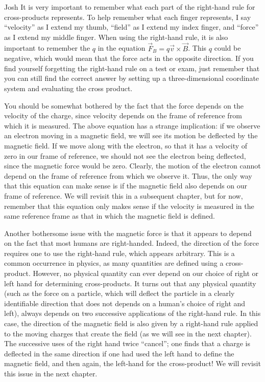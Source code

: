 \begin{studentOpinion}{Josh}{}
It is very important to remember what each part of the right-hand rule for cross-products represents. To help remember what each finger represents, I say ``velocity'' as I extend my thumb, ``field'' as I extend my index finger, and ``force'' as I extend my middle finger. When using the right-hand rule, it is also important to remember the $q$ in the equation $\vec F_B = q\vec v \times \vec B$. This $q$ could be negative, which would mean that the force acts in the opposite direction.
If you find yourself forgetting the right-hand rule on a test or exam, just remember that you can still find the correct answer by setting up a three-dimensional coordinate system and evaluating the cross product.
\end{studentOpinion}
You should be somewhat bothered by the fact that the force depends on the velocity of the charge, since velocity depends on the frame of reference from which it is measured. The above equation has a strange implication: if we observe an electron moving in a magnetic field, we will see its motion be deflected by the magnetic field. If we move along with the electron, so that it has a velocity of zero in our frame of reference, we should not see the electron being deflected, since the magnetic force would be zero. Clearly, the motion of the electron cannot depend on the frame of reference from which we observe it. Thus, the only way that this equation can make sense is if the magnetic field also depends on our frame of reference. We will revisit this in a subsequent chapter, but for now, remember that this equation only makes sense if the velocity is measured in the same reference frame as that in which the magnetic field is defined.

Another bothersome issue with the magnetic force is that it appears to depend on the fact that most humans are right-handed. Indeed, the direction of the force requires one to use the right-hand rule, which appears arbitrary. This is a common occurrence in physics, as many quantities are defined using a cross-product. However, no physical quantity can ever depend on our choice of right or left hand for determining cross-products. It turns out that any physical quantity (such as the force on a particle, which will deflect the particle in a clearly identifiable direction that does not depends on a human's choice of right and left), always depends on two successive applications of the right-hand rule. In this case, the direction of the magnetic field is also given by a right-hand rule applied to the moving charges that create the field (as we will see in the next chapter). The successive uses of the right hand twice ``cancel''; one finds that a charge is deflected in the same direction if one had used the left hand to define the magnetic field, and then again, the left-hand for the cross-product! We will revisit this issue in the next chapter.


